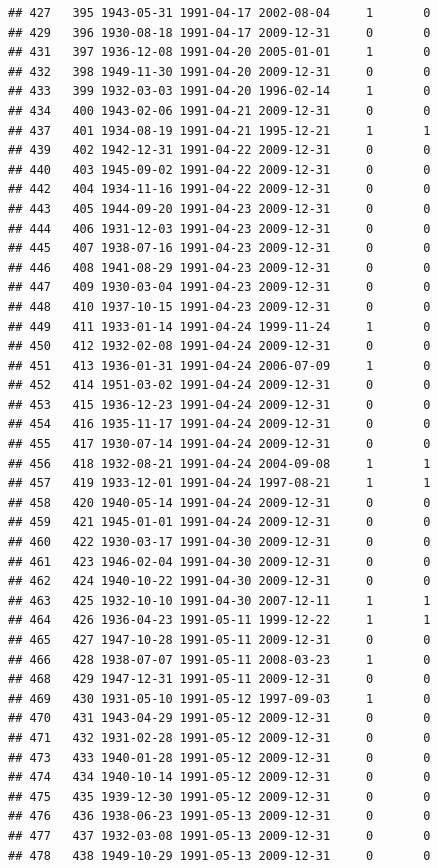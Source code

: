 \documentclass[
]{book}
\theoremstyle{definition}
\theoremstyle{definition}
\theoremstyle{definition}
\theoremstyle{definition}
\theoremstyle{remark}
\begin{document}
\begin{verbatim}
## 427   395 1943-05-31 1991-04-17 2002-08-04     1       0
## 429   396 1930-08-18 1991-04-17 2009-12-31     0       0
## 431   397 1936-12-08 1991-04-20 2005-01-01     1       0
## 432   398 1949-11-30 1991-04-20 2009-12-31     0       0
## 433   399 1932-03-03 1991-04-20 1996-02-14     1       0
## 434   400 1943-02-06 1991-04-21 2009-12-31     0       0
## 437   401 1934-08-19 1991-04-21 1995-12-21     1       1
## 439   402 1942-12-31 1991-04-22 2009-12-31     0       0
## 440   403 1945-09-02 1991-04-22 2009-12-31     0       0
## 442   404 1934-11-16 1991-04-22 2009-12-31     0       0
## 443   405 1944-09-20 1991-04-23 2009-12-31     0       0
## 444   406 1931-12-03 1991-04-23 2009-12-31     0       0
## 445   407 1938-07-16 1991-04-23 2009-12-31     0       0
## 446   408 1941-08-29 1991-04-23 2009-12-31     0       0
## 447   409 1930-03-04 1991-04-23 2009-12-31     0       0
## 448   410 1937-10-15 1991-04-23 2009-12-31     0       0
## 449   411 1933-01-14 1991-04-24 1999-11-24     1       0
## 450   412 1932-02-08 1991-04-24 2009-12-31     0       0
## 451   413 1936-01-31 1991-04-24 2006-07-09     1       0
## 452   414 1951-03-02 1991-04-24 2009-12-31     0       0
## 453   415 1936-12-23 1991-04-24 2009-12-31     0       0
## 454   416 1935-11-17 1991-04-24 2009-12-31     0       0
## 455   417 1930-07-14 1991-04-24 2009-12-31     0       0
## 456   418 1932-08-21 1991-04-24 2004-09-08     1       1
## 457   419 1933-12-01 1991-04-24 1997-08-21     1       1
## 458   420 1940-05-14 1991-04-24 2009-12-31     0       0
## 459   421 1945-01-01 1991-04-24 2009-12-31     0       0
## 460   422 1930-03-17 1991-04-30 2009-12-31     0       0
## 461   423 1946-02-04 1991-04-30 2009-12-31     0       0
## 462   424 1940-10-22 1991-04-30 2009-12-31     0       0
## 463   425 1932-10-10 1991-04-30 2007-12-11     1       1
## 464   426 1936-04-23 1991-05-11 1999-12-22     1       1
## 465   427 1947-10-28 1991-05-11 2009-12-31     0       0
## 466   428 1938-07-07 1991-05-11 2008-03-23     1       0
## 468   429 1947-12-31 1991-05-11 2009-12-31     0       0
## 469   430 1931-05-10 1991-05-12 1997-09-03     1       0
## 470   431 1943-04-29 1991-05-12 2009-12-31     0       0
## 471   432 1931-02-28 1991-05-12 2009-12-31     0       0
## 473   433 1940-01-28 1991-05-12 2009-12-31     0       0
## 474   434 1940-10-14 1991-05-12 2009-12-31     0       0
## 475   435 1939-12-30 1991-05-12 2009-12-31     0       0
## 476   436 1938-06-23 1991-05-13 2009-12-31     0       0
## 477   437 1932-03-08 1991-05-13 2009-12-31     0       0
## 478   438 1949-10-29 1991-05-13 2009-12-31     0       0

\end{verbatim}
\end{document}
